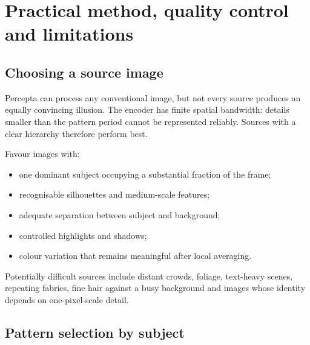 \section{Practical method, quality control and limitations}

\subsection{Choosing a source image}

Percepta can process any conventional image, but not every source produces an equally convincing illusion. The encoder has finite spatial bandwidth: details smaller than the pattern period cannot be represented reliably. Sources with a clear hierarchy therefore perform best.

Favour images with:

\begin{itemize}
  \item one dominant subject occupying a substantial fraction of the frame;
  \item recognisable silhouettes and medium-scale features;
  \item adequate separation between subject and background;
  \item controlled highlights and shadows;
  \item colour variation that remains meaningful after local averaging.
\end{itemize}

Potentially difficult sources include distant crowds, foliage, text-heavy scenes, repeating fabrics, fine hair against a busy background and images whose identity depends on one-pixel-scale detail.

\subsection{Pattern selection by subject}


